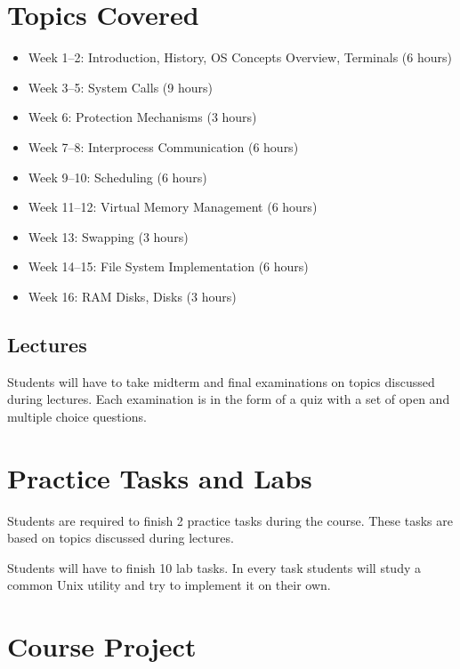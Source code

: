 \documentclass[12pt,a4paper,oneside]{article}
\begin{document}
    \section{Topics Covered}

        \begin{itemize}
            \item Week 1--2: Introduction, History, OS Concepts Overview, Terminals (6 hours)
            \item Week 3--5: System Calls (9 hours)
            \item Week 6: Protection Mechanisms (3 hours)
            \item Week 7--8: Interprocess Communication (6 hours)
            \item Week 9--10: Scheduling (6 hours)
            \item Week 11--12: Virtual Memory Management (6 hours)
            \item Week 13: Swapping (3 hours)
            \item Week 14--15: File System Implementation (6 hours)
            \item Week 16: RAM Disks, Disks (3 hours)
        \end{itemize}

    \subsection{Lectures}

        Students will have to take midterm and final examinations on topics
        discussed during lectures. Each examination is in the form of a quiz
        with a set of open and multiple choice questions.

    \section{Practice Tasks and Labs}

        Students are required to finish 2 practice tasks during the course.
        These tasks are based on topics discussed during lectures.

        Students will have to finish 10 lab tasks. In every task students will
        study a common Unix utility and try to implement it on their own.

    \section{Course Project}
\end{document}
